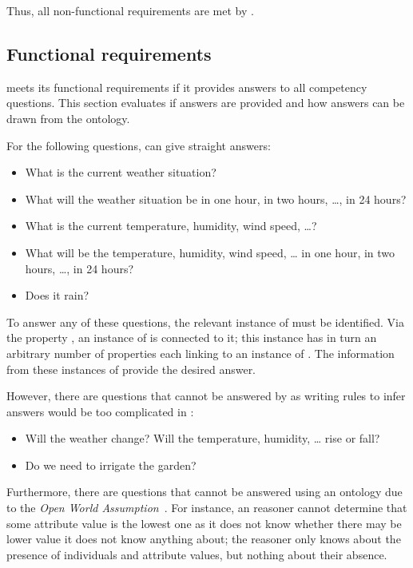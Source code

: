 Thus, all non-functional requirements are met by \smarthomeweather.

\subsection{Functional requirements}
\label{sec:evaluation_functional}

\smarthomeweather meets its functional requirements if it provides answers to all competency questions. This section evaluates if answers are provided and how answers can be drawn from the ontology.

For the following questions, \smarthomeweather can give straight answers:
\begin{itemize}
  \item What is the current weather situation?
  \item What will the weather situation be in one hour, in two hours, …, in 24 hours?
  \item What is the current temperature, humidity, wind speed, …?
  \item What will be the temperature, humidity, wind speed, … in one hour, in two hours, …, in 24 hours?
  \item Does it rain?
\end{itemize}
To answer any of these questions, the relevant instance of  must be identified. Via the property , an instance of  is connected to it; this instance has in turn an arbitrary number of  properties each linking to an instance of . The information from these instances of  provide the desired answer.

However, there are questions that cannot be answered by \smarthomeweather as writing rules to infer answers would be too complicated in :
\begin{itemize}
  \item Will the weather change? Will the temperature, humidity, … rise or fall?
  \item Do we need to irrigate the garden?
\end{itemize}

Furthermore, there are questions that cannot be answered using an  ontology due to the \emph{Open World Assumption}~\cite{open_world_assumption1}. For instance, an  reasoner cannot determine that some attribute value is the lowest one as it does not know whether there may be lower value it does not know anything about; the reasoner only knows about the presence of individuals and attribute values, but nothing about their absence.

